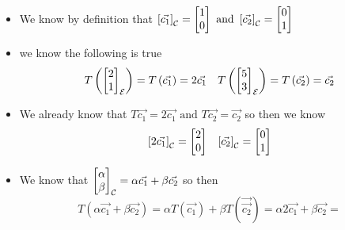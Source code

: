 \documentclass[11pt]{book}
\begin{document}
\begin{itemize}
    \item We know by definition that $\left[ \vec{c_1}  \right]_{\mathcal{C}} =  \begin{bmatrix} 1 \\ 0 \end{bmatrix} \text{ and } \left[ \vec{c_2}  \right]_{\mathcal{C}} =  \begin{bmatrix} 0 \\ 1 \end{bmatrix} $ 
    \item we know the following is true
        \begin{align*}
            T\left(\begin{bmatrix} 2 \\ 1 \end{bmatrix} _{\mathcal{E} } \right)=  T\left(\vec{c_1} \right)=  2\vec{c_1}  && T\left(\begin{bmatrix} 5 \\ 3 \end{bmatrix} _{\mathcal{E} } \right)=  T\left(\vec{c_2} \right)=  \vec{c_2} 
        \end{align*}
    \item We already know that $T\vec{c_1} =  2\vec{c_1} \text{ and } T\vec{c_2} =  \vec{c_2}  $ so then we know
        \begin{align*}
            \left[ 2\vec{c_1}  \right]_{\mathcal{C}} =  \begin{bmatrix} 2 \\ 0 \end{bmatrix}  && \left[ \vec{c_2}  \right]_{\mathcal{C}} =  \begin{bmatrix} 0 \\ 1 \end{bmatrix} 
        \end{align*}
    \item We know that $\begin{bmatrix} \alpha  \\ \beta  \end{bmatrix} _{\mathcal{C} } =  \alpha \vec{c_1}  + \beta \vec{c_2} $ so then
        \begin{equation*}
            T\left(\alpha \vec{c_1}  + \beta \vec{c_2} \right)=  \alpha T\left(\vec{c_1} \right) + \beta T\left(\vec{\vec{c_2} } \right)=  \alpha 2\vec{c_1}  + \beta \vec{c_2} =  
        \end{equation*}
\end{itemize}





\end{document}
